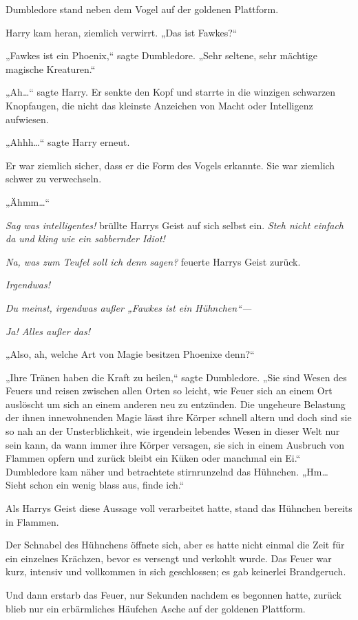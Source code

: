 {Dumbledore stand neben dem Vogel auf der goldenen Plattform.

Harry kam heran, ziemlich verwirrt. „Das ist Fawkes?“

„Fawkes ist ein Phoenix,“ sagte Dumbledore. „Sehr seltene, sehr mächtige magische Kreaturen.“

„Ah…“ sagte Harry. Er senkte den Kopf und starrte in die winzigen schwarzen Knopfaugen, die nicht das kleinste Anzeichen von Macht oder Intelligenz aufwiesen.

„Ahhh…“ sagte Harry erneut.

Er war ziemlich sicher, dass er die Form des Vogels erkannte. Sie war ziemlich schwer zu verwechseln.

„Ähmm…“

\emph{Sag was intelligentes!} brüllte Harrys Geist auf sich selbst ein. \emph{Steh nicht einfach da und kling wie ein sabbernder Idiot!}

\emph{Na, was zum Teufel soll ich denn sagen?} feuerte Harrys Geist zurück.

\emph{Irgendwas!}

\emph{Du meinst, irgendwas außer „Fawkes ist ein Hühnchen“—}

\emph{Ja! Alles außer das!}

„Also, ah, welche Art von Magie besitzen Phoenixe denn?“

„Ihre Tränen haben die Kraft zu heilen,“ sagte Dumbledore. „Sie sind Wesen des Feuers und reisen zwischen allen Orten so leicht, wie Feuer sich an einem Ort auslöscht um sich an einem anderen neu zu entzünden. Die ungeheure Belastung der ihnen innewohnenden Magie lässt ihre Körper schnell altern und doch sind sie so nah an der Unsterblichkeit, wie irgendein lebendes Wesen in dieser Welt nur sein kann, da wann immer ihre Körper versagen, sie sich in einem Ausbruch von Flammen opfern und zurück bleibt ein Küken oder manchmal ein Ei.“ Dumbledore kam näher und betrachtete stirnrunzelnd das Hühnchen. „Hm… Sieht schon ein wenig blass aus, finde ich.“

Als Harrys Geist diese Aussage voll verarbeitet hatte, stand das Hühnchen bereits in Flammen.

Der Schnabel des Hühnchens öffnete sich, aber es hatte nicht einmal die Zeit für ein einzelnes Krächzen, bevor es versengt und verkohlt wurde. Das Feuer war kurz, intensiv und vollkommen in sich geschlossen; es gab keinerlei Brandgeruch.

Und dann erstarb das Feuer, nur Sekunden nachdem es begonnen hatte, zurück blieb nur ein erbärmliches Häufchen Asche auf der goldenen Plattform.

}
